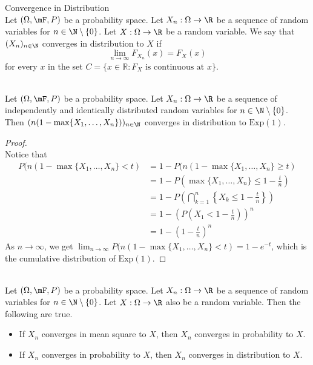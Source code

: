\documentclass[a4paper]{article}
\begin{document}
\begin{defn}{Convergence in Distribution}{}\\
Let $(\Omega,\mF,P)$ be a probability space. Let $X_n:\Omega\to\R$ be a sequence of random variables for $n\in\N\setminus\{0\}$. Let $X:\Omega\to\R$ be a random variable. We say that $(X_n)_{n\in\N}$ converges in distribution to $X$ if $$\lim_{n\to\infty}F_{X_n}(x)=F_X(x)$$ for every $x$ in the set $C=\{x\in\mathbb{R}:F_X\text{ is continuous at } x\}$. 
\end{defn}

\begin{eg}{}{}\\
Let $(\Omega,\mF,P)$ be a probability space. Let $X_n:\Omega\to\R$ be a sequence of independently and identically distributed random variables for $n\in\N\setminus\{0\}$. Then $(n(1-\max\{X_1,\dots,X_n\}))_{n\in\N}$ converges in distribution to $\text{Exp}(1)$. 
\begin{proof}\\
Notice that 
\begin{align*}
P(n(1-\max\{X_1,\dots,X_n\}<t)&=1-P(n(1-\max\{X_1,\dots,X_n\}\geq t)\\
&=1-P\left(\max\{X_1,\dots,X_n\}\leq 1-\frac{t}{n}\right)\\
&=1-P\left(\bigcap_{k=1}^n\left\{X_k\leq 1-\frac{t}{n}\right\}\right)\\
&=1-\left(P\left(X_1<1-\frac{t}{n}\right)\right)^n\\
&=1-\left(1-\frac{t}{n}\right)^n
\end{align*}
As $n\to\infty$, we get $\lim_{n\to\infty}P(n(1-\max\{X_1,\dots,X_n\}<t)=1-e^{-t}$, which is the cumulative distribution of $\text{Exp}(1)$. 
\end{proof}
\end{eg}

\begin{prp}{}{}\\
Let $(\Omega,\mF,P)$ be a probability space. Let $X_n:\Omega\to\R$ be a sequence of random variables for $n\in\N\setminus\{0\}$. Let $X:\Omega\to\R$ also be a random variable. Then the following are true. 
\begin{itemize}
\item If $X_n$ converges in mean square to $X$, then $X_n$ converges in probability to $X$. 
\item If $X_n$ converges in probability to $X$, then $X_n$ converges in distribution to $X$. 
\end{itemize}
\end{prp}
\end{document}
